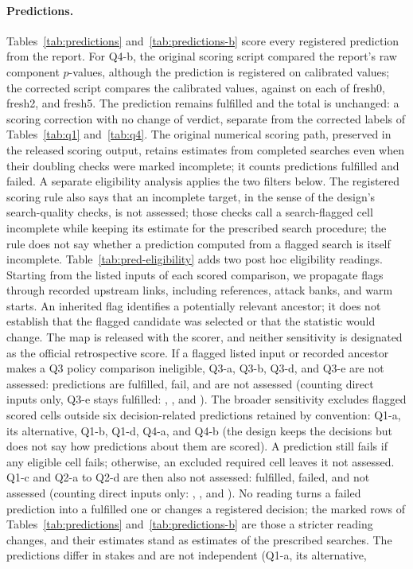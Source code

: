 \documentclass[11pt]{article}
\begin{document}
\paragraph{Predictions.} Tables~\ref{tab:predictions} and~\ref{tab:predictions-b} score every registered prediction from the report. For Q4-b, the original scoring script compared the report's raw component $p$-values, although the prediction is registered on calibrated values; the corrected script compares the calibrated values,  against  on each of fresh0, fresh2, and fresh5. The prediction remains fulfilled and the total is unchanged: a scoring correction with no change of verdict, separate from the corrected labels of Tables~\ref{tab:q1} and~\ref{tab:q4}. The original numerical scoring path, preserved in the released scoring output, retains estimates from completed searches even when their doubling checks were marked incomplete; it counts  predictions fulfilled and  failed. A separate eligibility analysis applies the two filters below. The registered scoring rule also says that an incomplete target, in the sense of the design's search-quality checks, is not assessed; those checks call a search-flagged cell incomplete while keeping its estimate for the prescribed search procedure; the rule does not say whether a prediction computed from a flagged search is itself incomplete. Table~\ref{tab:pred-eligibility} adds two post hoc eligibility readings. Starting from the listed inputs of each scored comparison, we propagate flags through recorded upstream links, including references, attack banks, and warm starts. An inherited flag identifies a potentially relevant ancestor; it does not establish that the flagged candidate was selected or that the statistic would change. The map is released with the scorer, and neither sensitivity is designated as the official retrospective score. If a flagged listed input or recorded ancestor makes a Q3 policy comparison ineligible, Q3-a, Q3-b, Q3-d, and Q3-e are not assessed:  predictions are fulfilled,  fail, and  are not assessed (counting direct inputs only, Q3-e stays fulfilled: , , and ). The broader sensitivity excludes flagged scored cells outside six decision-related predictions retained by convention: Q1-a, its alternative, Q1-b, Q1-d, Q4-a, and Q4-b (the design keeps the decisions but does not say how predictions about them are scored). A prediction still fails if any eligible cell fails; otherwise, an excluded required cell leaves it not assessed. Q1-c and Q2-a to Q2-d are then also not assessed:  fulfilled,  failed, and  not assessed (counting direct inputs only: , , and ). No reading turns a failed prediction into a fulfilled one or changes a registered decision; the marked rows of Tables~\ref{tab:predictions} and~\ref{tab:predictions-b} are those a stricter reading changes, and their estimates stand as estimates of the prescribed searches. The predictions differ in stakes and are not independent (Q1-a, its alternative, 
\end{document}
